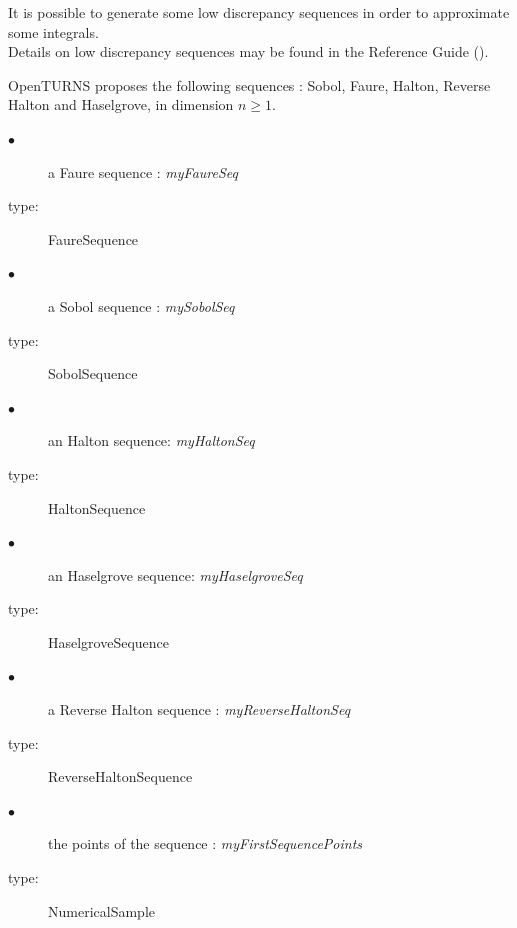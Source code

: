 \renewcommand{\filename}{docUC_LowDiscrepancySequences.tex}
\renewcommand{\filetitle}{UC : Generation of low discrepancy sequences}

\HeaderIILevel

\label{lowDiscrepancySequence}



It is possible to generate some low discrepancy sequences in order to approximate some integrals.\\

Details on low discrepancy sequences  may be found in the Reference Guide ().



OpenTURNS proposes the following sequences : Sobol, Faure, Halton, Reverse Halton and Haselgrove, in dimension $n \geq 1$.


\requirements{
  \begin{description}
  \item[$\bullet$] -
  \end{description}
}
             {
               \begin{description}
               \item[$\bullet$] a Faure sequence : {\itshape myFaureSeq}
               \item[type:] FaureSequence
               \item[$\bullet$] a Sobol sequence : {\itshape mySobolSeq}
               \item[type:] SobolSequence
               \item[$\bullet$] an Halton sequence: {\itshape myHaltonSeq}
               \item[type:] HaltonSequence
               \item[$\bullet$] an Haselgrove sequence: {\itshape myHaselgroveSeq}
               \item[type:] HaselgroveSequence
               \item[$\bullet$] a Reverse Halton sequence : {\itshape myReverseHaltonSeq}
               \item[type:] ReverseHaltonSequence
               \item[$\bullet$] the points of the sequence : {\itshape myFirstSequencePoints}
               \item[type:] NumericalSample
               \end{description}
             }

